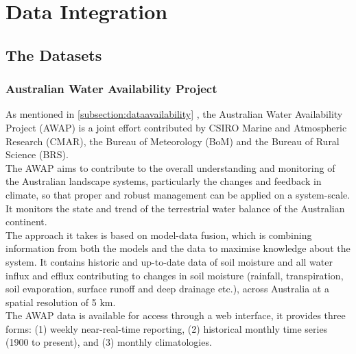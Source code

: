 
\chapter{Data Integration} %

\label{ch:dataintegration} %
%
\section{The Datasets}
\subsection{Australian Water Availability Project}
As mentioned in \autoref{subsection:dataavailability} , the Australian Water Availability Project (AWAP) is a joint effort contributed by CSIRO Marine and Atmospheric Research (CMAR), the Bureau of Meteorology (BoM) and the Bureau of Rural Science (BRS)\citep{Raupach2009}.\\
\newline
The AWAP aims to contribute to the overall understanding and monitoring of the Australian landscape systems, particularly the changes and feedback in climate, so that proper and robust management can be applied on a system-scale. It monitors the state and trend of the terrestrial water balance of the Australian continent.\\
\newline 
The approach it takes is based on model-data fusion, which is combining information from both the models and the data to maximise knowledge about the system. It contains historic and up-to-date data of soil moisture and all water influx and efflux contributing to changes in soil moisture (rainfall, transpiration, soil evaporation, surface runoff and deep drainage etc.), across Australia at a spatial resolution of 5 km. \\
\newline 
The AWAP data is available for access through a web interface, it provides three forms: (1) weekly near-real-time reporting, (2) historical monthly time series (1900 to present), and (3) monthly climatologies.\\
